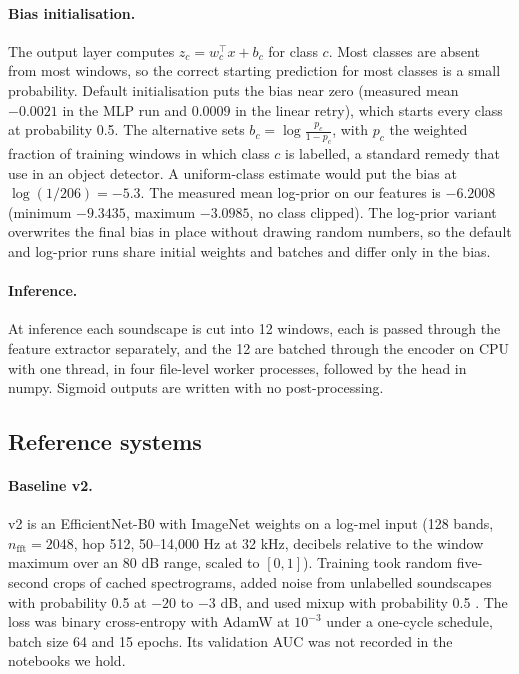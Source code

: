 \documentclass[letterpaper]{article} %
\begin{document}
\paragraph{Bias initialisation.}
The output layer computes $z_c = w_c^{\top}x + b_c$ for class $c$. Most classes are absent from most windows, so the correct starting prediction for most classes is a small probability. Default initialisation puts the bias near zero (measured mean $-0.0021$ in the MLP run and $0.0009$ in the linear retry), which starts every class at probability 0.5. The alternative sets $b_c=\log\frac{p_c}{1-p_c}$, with $p_c$ the weighted fraction of training windows in which class $c$ is labelled, a standard remedy that \citet{lin2017focal} use in an object detector. A uniform-class estimate would put the bias at $\log(1/206)=-5.3$. The measured mean log-prior on our features is $-6.2008$ (minimum $-9.3435$, maximum $-3.0985$, no class clipped). The log-prior variant overwrites the final bias in place without drawing random numbers, so the default and log-prior runs share initial weights and batches and differ only in the bias.

\paragraph{Inference.}
At inference each soundscape is cut into 12 windows, each is passed through the feature extractor separately, and the 12 are batched through the encoder on CPU with one thread, in four file-level worker processes, followed by the head in numpy. Sigmoid outputs are written with no post-processing.

\subsection{Reference systems}
\paragraph{Baseline v2.}
v2 is an EfficientNet-B0 with ImageNet weights on a log-mel input (128 bands, $n_\mathrm{fft}=2048$, hop 512, 50--14,000 Hz at 32 kHz, decibels relative to the window maximum over an 80 dB range, scaled to $[0,1]$). Training took random five-second crops of cached spectrograms, added noise from unlabelled soundscapes with probability 0.5 at $-20$ to $-3$ dB, and used mixup with probability 0.5 \citep{zhang2018mixup}. The loss was binary cross-entropy with AdamW at $10^{-3}$ under a one-cycle schedule, batch size 64 and 15 epochs. Its validation AUC was not recorded in the notebooks we hold.
\end{document}
